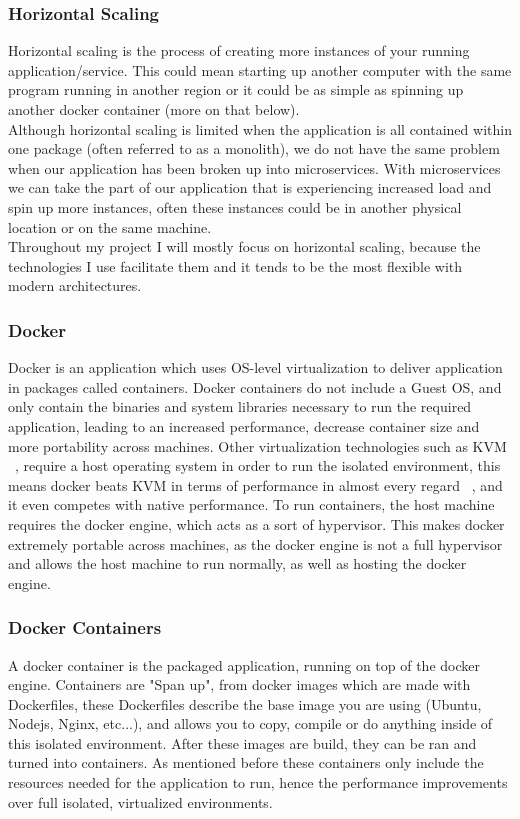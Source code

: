 \documentclass[titlepage]{article}
\begin{document}
\subsubsection{Horizontal Scaling}
Horizontal scaling is the process of creating more instances of your running application/service. This could mean starting up another computer with the same program running in another region or it could be as simple as spinning up another docker container (more on that below). \\

Although horizontal scaling is limited when the application is all contained within one package (often referred to as a monolith), we do not have the same problem when our application has been broken up into microservices. With microservices we can take the part of our application that is experiencing increased load and spin up more instances, often these instances could be in another physical location or on the same machine. \\

Throughout my project I will mostly focus on horizontal scaling, because the technologies I use facilitate them and it tends to be the most flexible with modern architectures.

\subsubsection{Docker}
Docker is an application which uses OS-level virtualization to deliver application in packages called containers. Docker containers do not include a Guest OS, and only contain the binaries and system libraries necessary to run the required application, leading to an increased performance, decrease container size and more portability across machines. Other virtualization technologies such as KVM ~\cite{kvm}, require a host operating system in order to run the isolated environment, this means docker beats KVM in terms of performance in almost every regard ~\cite{docker_performance}, and it even competes with native performance. To run containers, the host machine requires the docker engine, which acts as a sort of hypervisor. This makes docker extremely portable across machines, as the docker engine is not a full hypervisor and allows the host machine to run normally, as well as hosting the docker engine.

\subsubsection{Docker Containers}
A docker container is the packaged application, running on top of the docker engine. Containers are "Span up", from docker images which are made with Dockerfiles, these Dockerfiles describe the base image you are using (Ubuntu, Nodejs, Nginx, etc...), and allows you to copy, compile or do anything inside of this isolated environment. After these images are build, they can be ran and turned into containers. As mentioned before these containers only include the resources needed for the application to run, hence the performance improvements over full isolated, virtualized environments.
\end{document}

